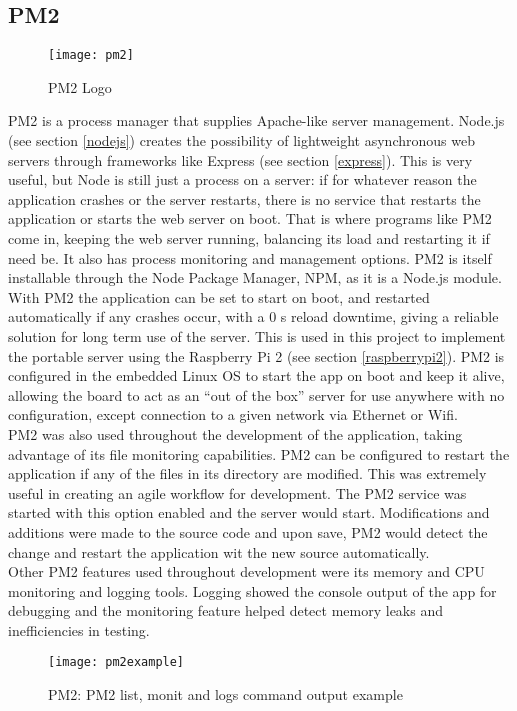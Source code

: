 \subsection{PM2}
\begin{figure}[H]
\centering
\texttt{[image: pm2]}
\caption{PM2 Logo}
\end{figure}
PM2 is a process manager that supplies Apache-like server management. Node.js (see section \ref{nodejs}) creates the possibility of
lightweight asynchronous web servers through frameworks like Express (see section \ref{express}). This is very useful, but Node is still
just a process on a server: if for whatever reason the application crashes or the server restarts, there is no service that restarts the
application or starts the web server on boot. That is where programs like PM2 come in, keeping the web server running, balancing its
load and restarting it if need be. It also has process monitoring and management options. PM2 is itself installable through the Node
Package Manager, NPM, as it is a Node.js module.\\

With PM2 the application can be set to start on boot, and restarted automatically if any crashes occur, with a 0 s reload downtime,
giving a reliable solution for long term use of the server. This is used in this project to implement the portable server using the
Raspberry Pi 2 (see section \ref{raspberrypi2}). PM2 is configured in the embedded Linux OS to start the app on boot and keep it alive,
allowing the board to act as an ``out of the box'' server for use anywhere with no configuration, except connection to a given network
via Ethernet or Wifi.\\

PM2 was also used throughout the development of the application, taking advantage of its file monitoring capabilities. PM2 can be
configured to restart the application if any of the files in its directory are modified. This was extremely useful in creating an agile
workflow for development. The PM2 service was started with this option enabled and the server would start. Modifications and additions
were made to the source code and upon save, PM2 would detect the change and restart the application wit the new source automatically.\\

Other PM2 features used throughout development were its memory and CPU monitoring and logging tools. Logging showed the console output
of the app for debugging and the monitoring feature helped detect memory leaks and inefficiencies in testing.
\begin{figure}[H]
\centering
\texttt{[image: pm2example]}
\caption{PM2: PM2 list, monit and logs command output example}
\end{figure}
